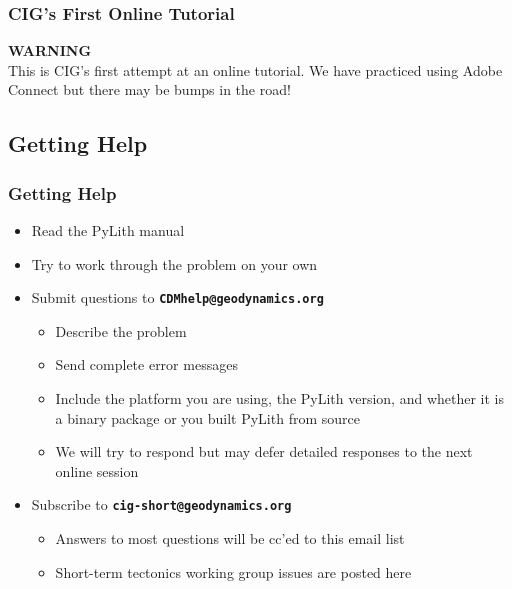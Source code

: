 \documentclass{beamer}
\newcommand{\important}[1]{{\bf\color{red}#1}}
\begin{document}
\begin{frame}
  \frametitle{CIG's First Online Tutorial}
  \summary{}
 
  \begin{center}
    {\Large\bf{\color{red} WARNING}}\\
    This is CIG's first attempt at an online tutorial. We have
    practiced using Adobe Connect but there may be bumps in the road!
  \end{center}

\end{frame}


\subsection{Getting Help}

\begin{frame}
  \frametitle{Getting Help}
  \summary{}
 
  \begin{itemize}
  \item Read the PyLith manual
  \item Try to work through the problem on your own
  \item Submit questions to \important{\tt CDMhelp@geodynamics.org}
    \begin{itemize}
    \item Describe the problem
    \item Send complete error messages
    \item Include the platform you are using, the PyLith version, and
      whether it is a binary package or you built PyLith from source
    \item We will try to respond but may defer detailed responses to
      the next online session
   \end{itemize}
  \item Subscribe to \important{\tt cig-short@geodynamics.org}
    \begin{itemize}
    \item Answers to most questions will be cc'ed to this email list
    \item Short-term tectonics working group issues are posted here
    \end{itemize}
  \end{itemize}

\end{frame}
\end{document}
